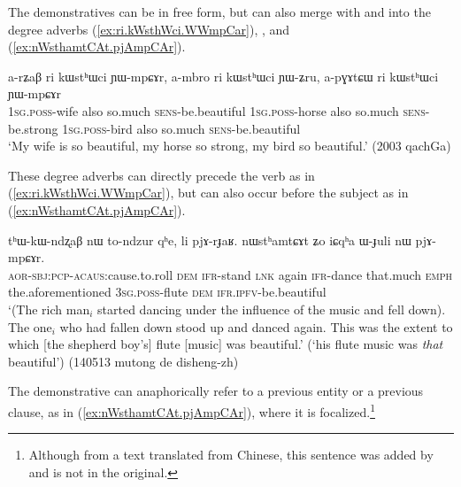 The demonstratives can be in free form, but can also merge with  and  into the degree adverbs  (\ref{ex:ri.kWsthWci.WWmpCar}), ,  and  (\ref{ex:nWsthamtCAt.pjAmpCAr}).


 \begin{exe}
\ex \label{ex:ri.kWsthWci.WWmpCar}
 \gll  a-rʑaβ ri kɯstʰɯci ɲɯ-mpɕɤr, a-mbro ri kɯstʰɯci ɲɯ-ʑru, a-pɣɤtɕɯ ri kɯstʰɯci ɲɯ-mpɕɤr  \\
 \textsc{1sg}.\textsc{poss}-wife also so.much \textsc{sens}-be.beautiful  \textsc{1sg}.\textsc{poss}-horse also so.much \textsc{sens}-be.strong  \textsc{1sg}.\textsc{poss}-bird also so.much \textsc{sens}-be.beautiful  \\
 \glt `My wife is so beautiful, my horse so strong, my bird so beautiful.' (2003 qachGa)
 \end{exe}

These degree adverbs can directly precede the verb as in (\ref{ex:ri.kWsthWci.WWmpCar}), but can also occur before the subject as in (\ref{ex:nWsthamtCAt.pjAmpCAr}). 

 \begin{exe}
\ex \label{ex:nWsthamtCAt.pjAmpCAr}
 \gll tʰɯ-kɯ-ndʐaβ nɯ to-ndzur qʰe, li pjɤ-rɟaʁ. nɯstʰamtɕɤt ʑo iɕqʰa ɯ-ɟuli nɯ pjɤ-mpɕɤr. \\
 \textsc{aor}-\textsc{sbj}:\textsc{pcp}-\textsc{acaus}:cause.to.roll \textsc{dem} \textsc{ifr}-stand \textsc{lnk} again \textsc{ifr}-dance that.much \textsc{emph} the.aforementioned \textsc{3sg}.\textsc{poss}-flute \textsc{dem} \textsc{ifr}.\textsc{ipfv}-be.beautiful \\
 \glt `(The rich man$_i$ started dancing under the influence of the music and fell down). The one$_i$ who had fallen down stood up and danced again. This was the extent to which [the shepherd boy's] flute [music] was beautiful.'  (`his flute music was \textit{that} beautiful') (140513 mutong de disheng-zh)
 \end{exe}
 
 The demonstrative can anaphorically refer to a previous entity or a previous clause, as in (\ref{ex:nWsthamtCAt.pjAmpCAr}), where it is focalized.\footnote{Although from a text translated from Chinese, this sentence was added by  and is not in the original.  }



